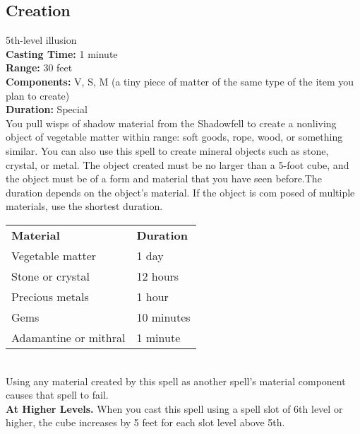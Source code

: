 \documentclass[11pt, A4paper, english]{article}
\begin{document}
		\subsection{Creation}
5th-level illusion \\
\textbf{Casting Time:} 1 minute \\
\textbf{Range:} 30 feet \\
\textbf{Components:} V, S, M (a tiny piece of matter of the same type of the item you plan to create) \\
\textbf{Duration:} Special \\
You pull wisps of shadow material from the Shadowfell to create a nonliving object of vegetable matter within range: soft goods, rope, wood, or something similar. You can also use this spell to create mineral objects such as stone, crystal, or metal. The object created must be no larger than a 5-foot cube, and the object must be of a form and material that you have seen before.The duration depends on the object’s material. If the object is com posed of multiple materials, use the shortest duration. \\
			\begin{tabular}{ll}
\textbf{Material} & \textbf{Duration} \\
Vegetable matter & 1 day \\
Stone or crystal & 12 hours \\
Precious metals & 1 hour \\
Gems & 10 minutes \\
Adamantine or mithral & 1 minute
			\end{tabular} \\
Using any material created by this spell as another spell’s material component causes that spell to fail. \\
\textbf{At Higher Levels.} When you cast this spell using a spell slot of 6th level or higher, the cube increases by 5 feet for each slot level above 5th.
\end{document}
